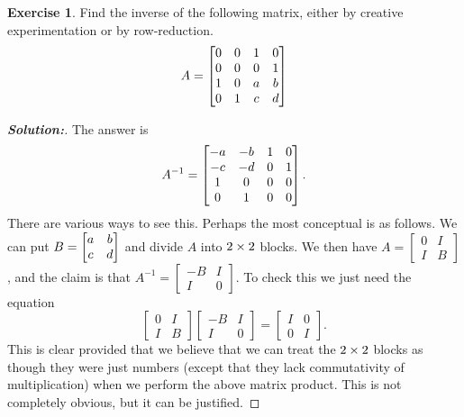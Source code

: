 \documentclass[a4paper]{amsart}
\theoremstyle{definition}
\newtheorem{exercise}{Exercise}
\newenvironment{solution}{\begin{proof}[\textbf{Solution:}] \vphantom{u}}{\end{proof}}
\begin{document}
\begin{exercise}\label{ex-inverse-ii}
 Find the inverse of the following matrix, either by creative
 experimentation or by row-reduction.
 \[ A = \left[\begin{matrix} 0&0&1&0 \\ 0&0&0&1 \\ 1&0&a&b \\ 0&1&c&d \end{matrix}\right] \]
\end{exercise}
\begin{solution}
 The answer is
 \[ A^{-1} =
     \left[\begin{matrix} -a&-b&1&0 \\ -c&-d&0&1 \\ 1&0&0&0 \\ 0&1&0&0 \end{matrix}\right].
 \]
 There are various ways to see this.  Perhaps the most conceptual is
 as follows.  We can put $B=\left[\begin{matrix} a&b\\ c&d\end{matrix}\right]$ and divide $A$ into
 $2\times 2$ blocks.  We then have
 $A=\left[\begin{array}{c|c} 0&I\\ \hline I&B\end{array}\right]$, and
 the claim is that 
 $A^{-1}=\left[\begin{array}{c|c} -B&I\\ \hline I&0\end{array}\right]$.
 To check this we just need the equation
 \[ \left[\begin{array}{c|c}  0&I \\ \hline I&B\end{array}\right]
    \left[\begin{array}{c|c} -B&I \\ \hline I&0\end{array}\right] = 
    \left[\begin{array}{c|c}  I&0 \\ \hline 0&I\end{array}\right].
 \]
 This is clear provided that we believe that we can treat the $2\times 2$
 blocks as though they were just numbers (except that they lack
 commutativity of multiplication) when we perform the above
 matrix product.  This is not completely obvious, but it can be
 justified. 


\end{solution}
\end{document}
